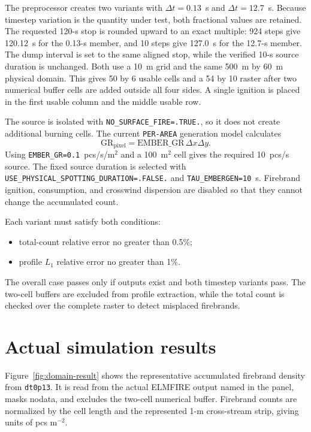 The preprocessor creates two variants with $\Delta t=0.13$~s and
$\Delta t=12.7$~s. Because timestep variation is the quantity under test, both fractional values are retained. The requested 120-s stop is rounded upward to an exact multiple: 924 steps give 120.12~s for the 0.13-s member, and 10 steps give 127.0~s for the 12.7-s member. The dump interval is set to the same aligned stop, while the verified 10-s source duration is unchanged. Both use a 10~m grid and the same 500~m by 60~m physical
domain. This gives 50 by 6 usable cells and a 54 by 10 raster after two numerical buffer cells are added outside all four sides. A single
ignition is placed in the first usable column and the middle usable row.

The source is isolated with \texttt{NO\_SURFACE\_FIRE=.TRUE.}, so it does not
create additional burning cells. The current \texttt{PER-AREA} generation
model calculates
\[
  \mathrm{GR}_{\mathrm{pixel}}
  =\mathrm{EMBER\_GR}\,\Delta x\Delta y.
\]
Using \texttt{EMBER\_GR=0.1}~pcs/s/m$^2$ and a 100~m$^2$ cell gives the
required 10~pcs/s source. The fixed source duration is selected with
\texttt{USE\_PHYSICAL\_SPOTTING\_DURATION=.FALSE.} and
\texttt{TAU\_EMBERGEN=10}~s. Firebrand ignition, consumption, and crosswind
dispersion are disabled so that they cannot change the accumulated count.


Each variant must satisfy both conditions:
\begin{itemize}
  \item total-count relative error no greater than 0.5\%;
  \item profile $L_1$ relative error no greater than 1\%.
\end{itemize}
The overall case passes only if outputs exist and both timestep variants pass.
The two-cell buffers are excluded from profile extraction, while the total
count is checked over the complete raster to detect misplaced firebrands.

\section{Actual simulation results}

Figure~\ref{fig:domain-result} shows the representative accumulated firebrand density from \texttt{dt0p13}.
It is read from the actual ELMFIRE output named in the panel, masks nodata, and excludes
the two-cell numerical buffer.  Firebrand counts are normalized by the cell length and the represented 1-m cross-stream strip, giving units of pcs m$^{-2}$.

